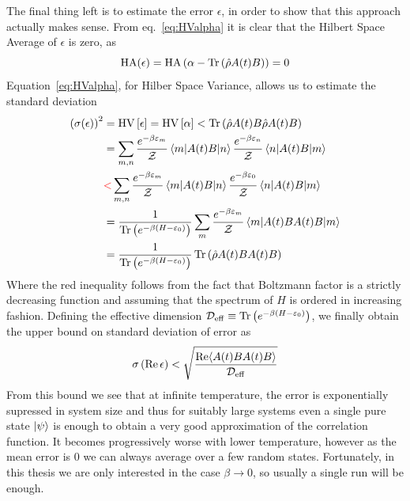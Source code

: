 The final thing left is to estimate the error \(\epsilon\), in order to show that this approach actually makes sense.
From eq.~\eqref{eq:HValpha} it is clear that the Hilbert Space Average of \(\epsilon\) is zero, as
\begin{equation}
	\mathrm{HA}(\epsilon) = \mathrm{HA}\left(\alpha - \Tr\left(\hat{\rho}A(t)B\right)\right) = 0
\end{equation}
Equation~\eqref{eq:HValpha}, for Hilber Space Variance, allows us to estimate the standard deviation 
\begin{align}
	\left(\sigma(\epsilon)\right)^2 &= \mathrm{HV}\left[\epsilon\right] = \mathrm{HV}\left[\alpha\right] < \Tr\left(\hat{\rho}A(t)B \hat{\rho}A(t)B\right) \nonumber\\
	&= \sum_{m,n} \frac{e^{-\beta \varepsilon_m}}{\mathcal{Z}} \matrixel{m}{A(t)B}{n} \frac{e^{-\beta \varepsilon_n}}{\mathcal{Z}} \matrixel{n}{A(t)B}{m}\nonumber \\
	&\textcolor{red}{<}  \sum_{m,n} \frac{e^{-\beta \varepsilon_m}}{\mathcal{Z}} \matrixel{m}{A(t)B}{n} \frac{e^{-\beta \varepsilon_0}}{\mathcal{Z}} \matrixel{n}{A(t)B}{m} \nonumber\\
	&= \frac{1}{\Tr\left(e^{-\beta(H-\varepsilon_0)}\right)} \sum_{m} \frac{e^{-\beta \varepsilon_m}}{\mathcal{Z}} \matrixel{m}{A(t)B A(t) B}{m} \nonumber\\
	&= \frac{1}{\Tr\left(e^{-\beta(H-\varepsilon_0)}\right)} \Tr\left(\hat{\rho} A(t)B A(t) B\right)
\end{align}
Where the red inequality follows from the fact that Boltzmann factor is a strictly decreasing function and assuming that the spectrum
of \(H\) is ordered in increasing fashion. Defining the effective dimension \(\mathcal{D}_{\mathrm{eff}} \equiv \Tr\left(e^{-\beta(H-\varepsilon_0)}\right)\),
we finally obtain the upper bound on standard deviation of error as 
\begin{equation}
	\sigma\left(\Re \epsilon\right) < \sqrt{\frac{\Re \langle A(t)B A(t) B \rangle}{\mathcal{D}_{\mathrm{eff}}}}
	\label{eg:dqt_bound}
\end{equation}
From this bound we see that at infinite temperature, the error is exponentially supressed in system size and thus for suitably
large systems even a single pure state \(\ket{\psi}\) is enough to obtain a very good approximation of the correlation function.
It becomes progressively worse with lower temperature, however as the mean error is \(0\) we can always average over a few random
states. Fortunately, in this thesis we are only interested in the case \(\beta \to 0\), so usually a single run will be enough.

